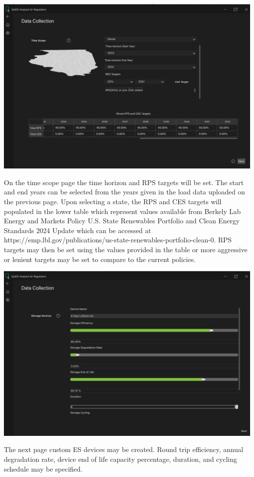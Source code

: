 \documentclass{article}
\begin{document}
\begin{center}
    \includegraphics[width=0.8\linewidth]{pics/time_horizon.png}
\end{center}
On the time scope page the time horizon and RPS targets will be set. The start and end years can be selected from the years given in the load data uploaded on the previous page. Upon selecting a state, the RPS and CES targets will populated in the lower table which represent values available from Berkely Lab Energy and Markets Policy U.S. State Renewables Portfolio and Clean Energy Standards 2024 Update which can be accessed at  https://emp.lbl.gov/publications/us-state-renewables-portfolio-clean-0. RPS targets may then be set using the values provided in the table or more aggressive or lenient targets may be set to compare to the current policies.

\begin{center}
    \includegraphics[width=0.8\linewidth]{pics/battery.png}
\end{center}
The next page custom ES devices may be created. Round trip efficiency, annual degradation rate, device end of life capacity percentage, duration, and cycling schedule may be specified.  
\end{document}
